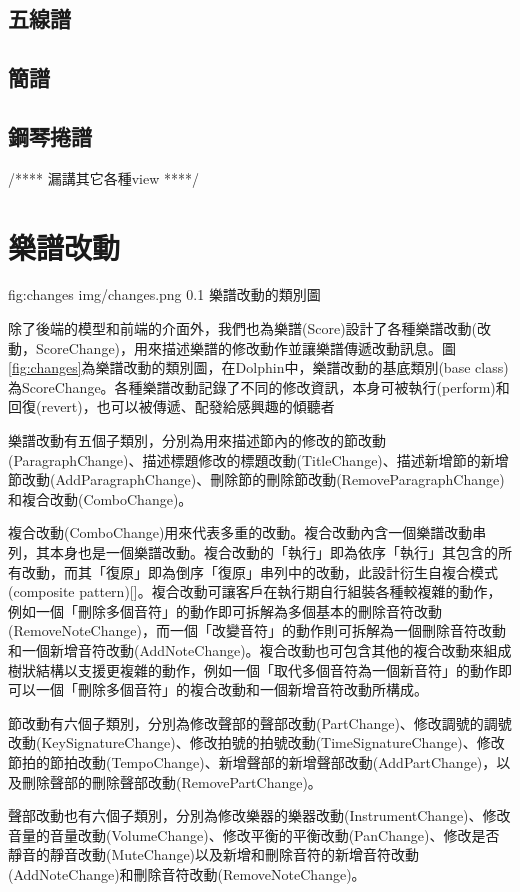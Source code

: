 \documentclass[12pt,a4paper,oneside]{report}
\begin{document}
\subsection{五線譜}
\subsection{簡譜}
\subsection{鋼琴捲譜}
/****
漏講其它各種view
****/

\section{樂譜改動}

\figurewithcaption
{fig:changes}
{img/changes.png}
{0.1}
{樂譜改動的類別圖}

除了後端的模型和前端的介面外，我們也為樂譜(Score)設計了各種樂譜改動(改動，ScoreChange)，用來描述樂譜的修改動作並讓樂譜傳遞改動訊息。圖 \ref{fig:changes}為樂譜改動的類別圖，在Dolphin中，樂譜改動的基底類別(base class)為ScoreChange。各種樂譜改動記錄了不同的修改資訊，本身可被執行(perform)和回復(revert)，也可以被傳遞、配發給感興趣的傾聽者

樂譜改動有五個子類別，分別為用來描述節內的修改的節改動(ParagraphChange)、描述標題修改的標題改動(TitleChange)、描述新增節的新增節改動(AddParagraphChange)、刪除節的刪除節改動(RemoveParagraphChange)和複合改動(ComboChange)。

複合改動(ComboChange)用來代表多重的改動。複合改動內含一個樂譜改動串列，其本身也是一個樂譜改動。複合改動的「執行」即為依序「執行」其包含的所有改動，而其「復原」即為倒序「復原」串列中的改動，此設計衍生自複合模式(composite pattern)[]。複合改動可讓客戶在執行期自行組裝各種較複雜的動作，例如一個「刪除多個音符」的動作即可拆解為多個基本的刪除音符改動(RemoveNoteChange)，而一個「改變音符」的動作則可拆解為一個刪除音符改動和一個新增音符改動(AddNoteChange)。複合改動也可包含其他的複合改動來組成樹狀結構以支援更複雜的動作，例如一個「取代多個音符為一個新音符」的動作即可以一個「刪除多個音符」的複合改動和一個新增音符改動所構成。

節改動有六個子類別，分別為修改聲部的聲部改動(PartChange)、修改調號的調號改動(KeySignatureChange)、修改拍號的拍號改動(TimeSignatureChange)、修改節拍的節拍改動(TempoChange)、新增聲部的新增聲部改動(AddPartChange)，以及刪除聲部的刪除聲部改動(RemovePartChange)。

聲部改動也有六個子類別，分別為修改樂器的樂器改動(InstrumentChange)、修改音量的音量改動(VolumeChange)、修改平衡的平衡改動(PanChange)、修改是否靜音的靜音改動(MuteChange)以及新增和刪除音符的新增音符改動(AddNoteChange)和刪除音符改動(RemoveNoteChange)。
\end{document}
